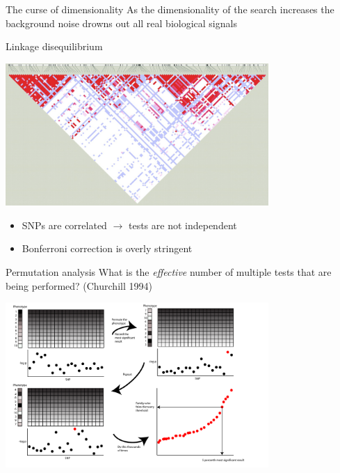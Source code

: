 \documentclass{beamer}
\begin{document}
\begin{frame}{The curse of dimensionality}
As the dimensionality of the search increases the background noise drowns out all real biological signals
\end{frame}

\begin{frame}{Linkage disequilibrium}
\begin{center}
\includegraphics[width=10cm]{ld.png}
\end{center}
\begin{itemize}
\item SNPs are correlated $\rightarrow$ tests are not independent
\item Bonferroni correction is overly stringent
\end{itemize}
\end{frame}

\begin{frame}{Permutation analysis}
What is the \emph{effective} number of multiple tests that are being performed? (Churchill 1994)
\begin{center}
\includegraphics[width=10cm]{permutationanalysis.pdf}
\end{center}
\end{frame}
\end{document}
